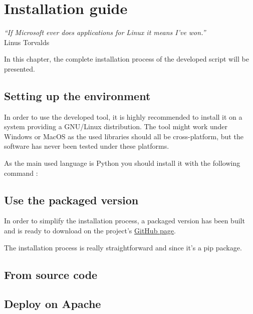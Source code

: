 

\chapter{Installation guide} %
\label{chap:installation}
\begin{flushright}
\textit{``If Microsoft ever does applications for Linux it means I've won.''} \\ Linus Torvalds
\end{flushright}


In this chapter, the complete installation process of the developed script will be presented.

\section {Setting up the environment}

In order to use the developed tool, it is highly recommended to install it on a system providing a GNU/Linux distribution. The tool might work under Windows or MacOS as the used libraries should all be cross-platform, but the software has never been tested under these platforms.

As the main used language is Python you should install it with the following command :


\section{Use the packaged version}
In order to simplify the installation process, a packaged version has been built and is ready to download on the project's \href{https://github.com/dchenaux/Yoda}{GitHub page}.

The installation process is really straightforward and since it's a \gls{pip} package.

\section{From source code}

\section{Deploy on Apache}

